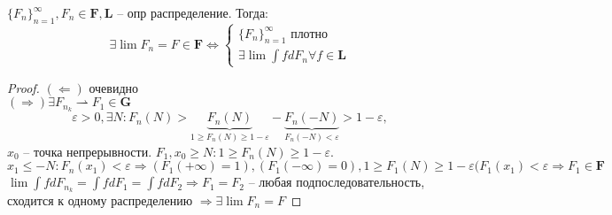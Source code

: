 \documentclass{article}
\begin{document}
    \begin{theorem}
        $\{F_n\}_{n=1}^\infty, F_n \in \mathbf{F}, \mathbf{L}$ -- опр распределение. Тогда:
        $$\exists \lim F_n = F \in \mathbf{F} \Leftrightarrow \begin{cases}
            \{F_n\}_{n=1}^\infty \text{ плотно}\\
            \exists \lim \int fdF_n \forall f \in \mathbf{L}
        \end{cases}$$
        \begin{proof}
            $(\Leftarrow)$ очевидно \\
            $(\Rightarrow) \exists F_{n_k} \rightharpoonup F_1 \in \mathbf{G}$
            $$ \varepsilon > 0, \exists N: F_n(N) > \underbrace{F_n(N)}_{1 \ge F_n(N) \ge 1 - \varepsilon} - \underbrace{F_n(-N)}_{F_n(-N) < \varepsilon} > 1 - \varepsilon, $$
            $x_0$ -- точка непрерывности. $F_1, x_0 \ge N: 1 \ge F_n(N) \ge 1 - \varepsilon$. \\
            $x_1 \le -N: F_n(x_1) < \varepsilon \Rightarrow (F_1(+\infty) = 1), (F_1(-\infty) = 0), 1 \ge F_1(N) \ge 1 - \varepsilon (F_1(x_1) < \varepsilon \Rightarrow F_1 \in \mathbf{F} $ \\
            $\lim \int fdF_{n_k}=\int fdF_1 = \int fdF_2 \Rightarrow F_1 = F_2 $ -- любая подпоследовательность, сходится к одному распределению $\Rightarrow \exists \lim F_n = F$ 
        \end{proof}
    \end{theorem}
\end{document}
